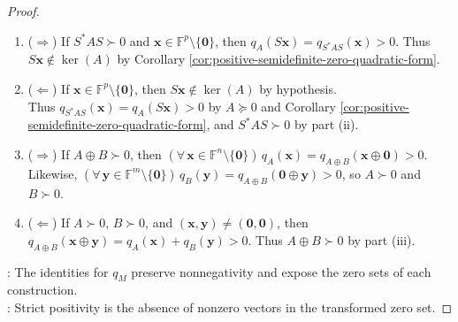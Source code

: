 \begin{theorem}
\begin{proof}
\begin{enumerate}[label=(\roman*)]
\item[$(v)$] ($\Rightarrow$) If $S^*AS\succ0$ and $\mathbf{x}\in\mathbb{F}^p\setminus\{\mathbf{0}\}$, then $q_A(S\mathbf{x})=q_{S^*AS}(\mathbf{x})>0$. Thus $S\mathbf{x}\notin\ker(A)$ by Corollary \ref{cor:positive-semidefinite-zero-quadratic-form}.
\item[$(v)$] ($\Leftarrow$) If $\mathbf{x}\in\mathbb{F}^p\setminus\{\mathbf{0}\}$, then $S\mathbf{x}\notin\ker(A)$ by hypothesis.\\
Thus $q_{S^*AS}(\mathbf{x})=q_A(S\mathbf{x})>0$ by $A\succeq0$ and Corollary \ref{cor:positive-semidefinite-zero-quadratic-form}, and $S^*AS\succ0$ by part (ii).
\item[$(vi)$] ($\Rightarrow$) If $A\oplus B\succ0$, then $(\forall\,\mathbf{x}\in\mathbb{F}^n\setminus\{\mathbf{0}\})\,q_A(\mathbf{x})=q_{A\oplus B}(\mathbf{x}\oplus\mathbf{0})>0$.\\
Likewise, $(\forall\,\mathbf{y}\in\mathbb{F}^m\setminus\{\mathbf{0}\})\,q_B(\mathbf{y})=q_{A\oplus B}(\mathbf{0}\oplus\mathbf{y})>0$, so $A\succ0$ and $B\succ0$.
\item[$(vi)$] ($\Leftarrow$) If $A\succ0$, $B\succ0$, and $(\mathbf{x},\mathbf{y})\neq(\mathbf{0},\mathbf{0})$, then $q_{A\oplus B}(\mathbf{x}\oplus\mathbf{y})=q_A(\mathbf{x})+q_B(\mathbf{y})>0$. Thus $A\oplus B\succ0$ by part (iii).
\end{enumerate}
: The identities for $q_M$ preserve nonnegativity and expose the zero sets of each construction.\\
: Strict positivity is the absence of nonzero vectors in the transformed zero set.
\end{proof}
\end{theorem}

